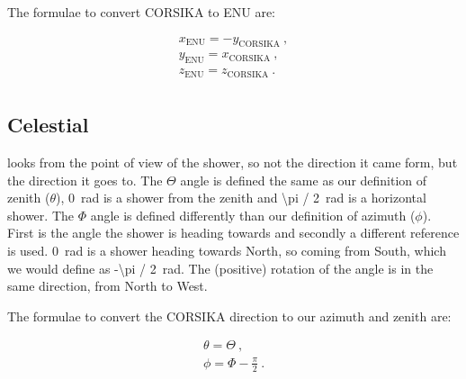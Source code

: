 The formulae to convert CORSIKA to ENU are:

\begin{equation}
    \begin{array}{l}
        x_{\mathrm{ENU}} = -y_{\mathrm{CORSIKA}} \ , \\
        y_{\mathrm{ENU}} = x_{\mathrm{CORSIKA}} \ , \\
        z_{\mathrm{ENU}} = z_{\mathrm{CORSIKA}} \ . \\
    \end{array}
\end{equation}


\subsection{Celestial}

\corsika looks from the point of view of the shower, so not the
direction it came form, but the direction it goes to. The $\Theta$ angle
is defined the same as our definition of zenith ($\theta$),
\SI{0}{\radian} is a shower from the zenith and \SI{\pi / 2}{\radian} is
a horizontal shower. The $\Phi$ angle is defined differently than our
definition of azimuth ($\phi$). First is the angle the shower is heading
towards and secondly a different reference is used. \SI{0}{\radian} is a
shower heading towards North, so coming from South, which we would
define as \SI{-\pi / 2}{\radian}. The (positive) rotation of the angle is
in the same direction, from North to West.

The formulae to convert the CORSIKA direction to our azimuth and zenith are:

\begin{equation}
    \begin{array}{l}
        \theta = \Theta \ , \\
        \phi = \Phi - \frac{\pi}{2} \ . \\
    \end{array}
\end{equation}
